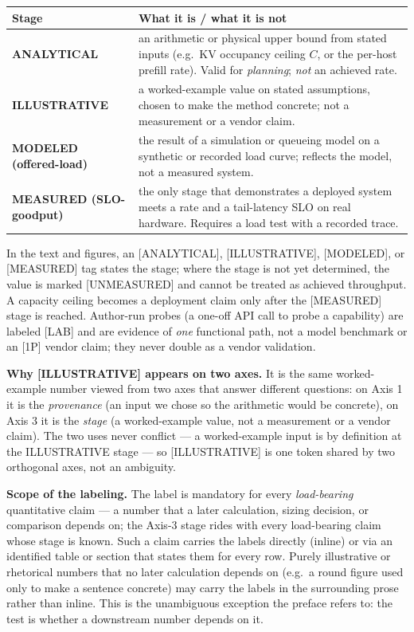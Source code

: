 \noindent\begin{tabularx}{\textwidth}{@{}>{\raggedright\arraybackslash}p{1.75in} >{\raggedright\arraybackslash}X@{}}
\toprule
\textbf{Stage} & \textbf{What it is / what it is not}\\
\midrule
\textbf{ANALYTICAL} & an arithmetic or physical upper bound from stated inputs (e.g.\ KV occupancy ceiling $C$, or the per-host prefill rate). Valid for \emph{planning}; \emph{not} an achieved rate.\\
\textbf{ILLUSTRATIVE} & a worked-example value on stated assumptions, chosen to make the method concrete; not a measurement or a vendor claim.\\
\textbf{MODELED (offered-load)} & the result of a simulation or queueing model on a synthetic or recorded load curve; reflects the model, not a measured system.\\
\textbf{MEASURED (SLO-goodput)} & the only stage that demonstrates a deployed system meets a rate and a tail-latency SLO on real hardware. Requires a load test with a recorded trace.\\
\bottomrule
\end{tabularx}

\noindent In the text and figures, an \textsc{[ANALYTICAL]}, \textsc{[ILLUSTRATIVE]}, \textsc{[MODELED]}, or \textsc{[MEASURED]} tag states the stage; where the stage is not yet determined, the value is marked \textsc{[UNMEASURED]} and cannot be treated as achieved throughput. A capacity ceiling becomes a deployment claim only after the \textsc{[MEASURED]} stage is reached. Author-run probes (a one-off API call to probe a capability) are labeled \textsc{[LAB]} and are evidence of \emph{one} functional path, not a model benchmark or an [1P] vendor claim; they never double as a vendor validation.

\noindent\textbf{Why \textsc{[ILLUSTRATIVE]} appears on two axes.} It is the same worked-example number viewed from two axes that answer different questions: on Axis 1 it is the \emph{provenance} (an input we chose so the arithmetic would be concrete), on Axis 3 it is the \emph{stage} (a worked-example value, not a measurement or a vendor claim). The two uses never conflict --- a worked-example input is by definition at the ILLUSTRATIVE stage --- so \textsc{[ILLUSTRATIVE]} is one token shared by two orthogonal axes, not an ambiguity.

\medskip
\noindent\textbf{Scope of the labeling.} The label is mandatory for every \emph{load-bearing} quantitative claim --- a number that a later calculation, sizing decision, or comparison depends on; the Axis-3 stage rides with every load-bearing claim whose stage is known. Such a claim carries the labels directly (inline) or via an identified table or section that states them for every row. Purely illustrative or rhetorical numbers that no later calculation depends on (e.g.\ a round figure used only to make a sentence concrete) may carry the labels in the surrounding prose rather than inline. This is the unambiguous exception the preface refers to: the test is whether a downstream number depends on it.

